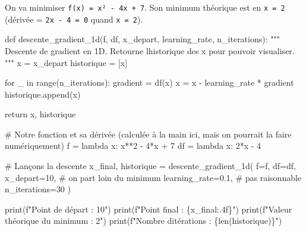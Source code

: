 \documentclass[
  french,
  11pt,
  a4paper,
]{scrbook}
\newenvironment{Shaded}{}{}
\newcommand{\BuiltInTok}[1]{\textcolor[rgb]{0.84,0.23,0.29}{#1}}
\newcommand{\CommentTok}[1]{\textcolor[rgb]{0.42,0.45,0.49}{#1}}
\newcommand{\ControlFlowTok}[1]{\textcolor[rgb]{0.84,0.23,0.29}{#1}}
\newcommand{\DecValTok}[1]{\textcolor[rgb]{0.00,0.36,0.77}{#1}}
\newcommand{\FloatTok}[1]{\textcolor[rgb]{0.00,0.36,0.77}{#1}}
\newcommand{\KeywordTok}[1]{\textcolor[rgb]{0.84,0.23,0.29}{#1}}
\newcommand{\NormalTok}[1]{\textcolor[rgb]{0.14,0.16,0.18}{#1}}
\newcommand{\OperatorTok}[1]{\textcolor[rgb]{0.14,0.16,0.18}{#1}}
\newcommand{\SpecialCharTok}[1]{\textcolor[rgb]{0.00,0.36,0.77}{#1}}
\newcommand{\SpecialStringTok}[1]{\textcolor[rgb]{0.01,0.18,0.38}{#1}}
\begin{document}
On va minimiser \texttt{f(x)\ =\ x²\ -\ 4x\ +\ 7}. Son minimum théorique
est en \texttt{x\ =\ 2} (dérivée = \texttt{2x\ -\ 4\ =\ 0} quand
\texttt{x\ =\ 2}).

\begin{Shaded}
\begin{Highlighting}[]
\KeywordTok{def}\NormalTok{ descente\_gradient\_1d(f, df, x\_depart, learning\_rate, n\_iterations):}
    \CommentTok{"""}
\CommentTok{    Descente de gradient en 1D.}
\CommentTok{    Retourne l\textquotesingle{}historique des x pour pouvoir visualiser.}
\CommentTok{    """}
\NormalTok{    x }\OperatorTok{=}\NormalTok{ x\_depart}
\NormalTok{    historique }\OperatorTok{=}\NormalTok{ [x]}
    
    \ControlFlowTok{for}\NormalTok{ \_ }\KeywordTok{in} \BuiltInTok{range}\NormalTok{(n\_iterations):}
\NormalTok{        gradient }\OperatorTok{=}\NormalTok{ df(x)}
\NormalTok{        x }\OperatorTok{=}\NormalTok{ x }\OperatorTok{{-}}\NormalTok{ learning\_rate }\OperatorTok{*}\NormalTok{ gradient}
\NormalTok{        historique.append(x)}
    
    \ControlFlowTok{return}\NormalTok{ x, historique}

\CommentTok{\# Notre fonction et sa dérivée (calculée à la main ici, mais on pourrait la faire numériquement)}
\NormalTok{f }\OperatorTok{=} \KeywordTok{lambda}\NormalTok{ x: x}\OperatorTok{**}\DecValTok{2} \OperatorTok{{-}} \DecValTok{4}\OperatorTok{*}\NormalTok{x }\OperatorTok{+} \DecValTok{7}
\NormalTok{df }\OperatorTok{=} \KeywordTok{lambda}\NormalTok{ x: }\DecValTok{2}\OperatorTok{*}\NormalTok{x }\OperatorTok{{-}} \DecValTok{4}

\CommentTok{\# Lançons la descente}
\NormalTok{x\_final, historique }\OperatorTok{=}\NormalTok{ descente\_gradient\_1d(}
\NormalTok{    f}\OperatorTok{=}\NormalTok{f, df}\OperatorTok{=}\NormalTok{df, }
\NormalTok{    x\_depart}\OperatorTok{=}\DecValTok{10}\NormalTok{,       }\CommentTok{\# on part loin du minimum}
\NormalTok{    learning\_rate}\OperatorTok{=}\FloatTok{0.1}\NormalTok{, }\CommentTok{\# pas raisonnable}
\NormalTok{    n\_iterations}\OperatorTok{=}\DecValTok{30}
\NormalTok{)}

\BuiltInTok{print}\NormalTok{(}\SpecialStringTok{f"Point de départ : 10"}\NormalTok{)}
\BuiltInTok{print}\NormalTok{(}\SpecialStringTok{f"Point final     : }\SpecialCharTok{\{}\NormalTok{x\_final}\SpecialCharTok{:.4f\}}\SpecialStringTok{"}\NormalTok{)}
\BuiltInTok{print}\NormalTok{(}\SpecialStringTok{f"Valeur théorique du minimum : 2"}\NormalTok{)}
\BuiltInTok{print}\NormalTok{(}\SpecialStringTok{f"Nombre d\textquotesingle{}itérations         : }\SpecialCharTok{\{}\BuiltInTok{len}\NormalTok{(historique)}\SpecialCharTok{\}}\SpecialStringTok{"}\NormalTok{)}
\end{Highlighting}
\end{Shaded}
\end{document}
